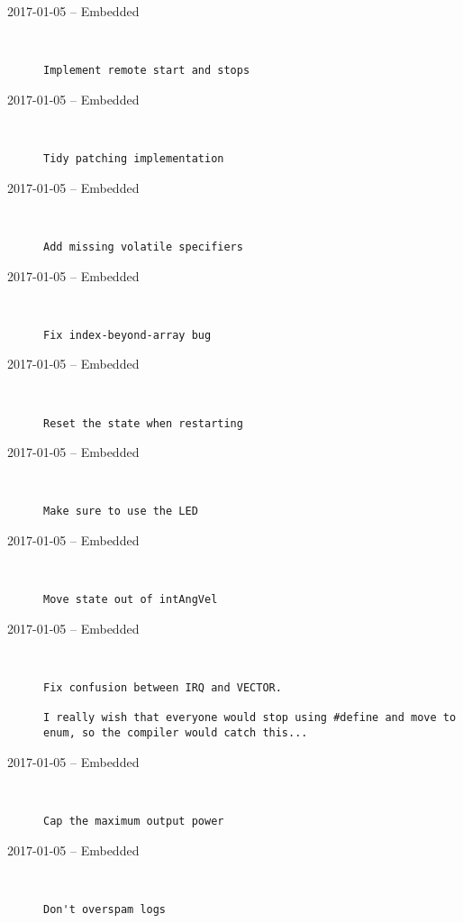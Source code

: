 \begin{description}
  \item[2017-01-05 -- Embedded] \hfill \
\begin{lstlisting}
Implement remote start and stops
\end{lstlisting}


  \item[2017-01-05 -- Embedded] \hfill \
\begin{lstlisting}
Tidy patching implementation
\end{lstlisting}


  \item[2017-01-05 -- Embedded] \hfill \
\begin{lstlisting}
Add missing volatile specifiers
\end{lstlisting}


  \item[2017-01-05 -- Embedded] \hfill \
\begin{lstlisting}
Fix index-beyond-array bug
\end{lstlisting}


  \item[2017-01-05 -- Embedded] \hfill \
\begin{lstlisting}
Reset the state when restarting
\end{lstlisting}


  \item[2017-01-05 -- Embedded] \hfill \
\begin{lstlisting}
Make sure to use the LED
\end{lstlisting}


  \item[2017-01-05 -- Embedded] \hfill \
\begin{lstlisting}
Move state out of intAngVel
\end{lstlisting}


  \item[2017-01-05 -- Embedded] \hfill \
\begin{lstlisting}
Fix confusion between IRQ and VECTOR.

I really wish that everyone would stop using #define and move to enum, so the compiler would catch this...
\end{lstlisting}


  \item[2017-01-05 -- Embedded] \hfill \
\begin{lstlisting}
Cap the maximum output power
\end{lstlisting}


  \item[2017-01-05 -- Embedded] \hfill \
\begin{lstlisting}
Don't overspam logs
\end{lstlisting}



\end{description}
